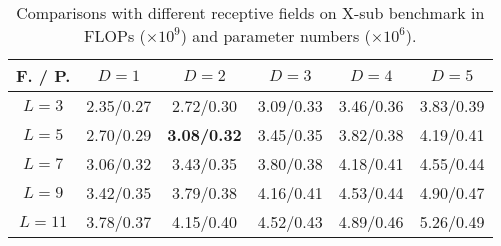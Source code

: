 \documentclass[10pt,journal,compsoc]{IEEEtran}
\begin{document}
\begin{table}[ht]
  \vspace{-0.4cm}
  \caption{Comparisons with different receptive fields on X-sub benchmark in FLOPs ($\times10^9$) and parameter numbers ($\times10^6$).}
  \label{tab:receptive_complexity}
  \vspace{-0.4cm}
  \centering
  \setlength{\tabcolsep}{4pt}
  \renewcommand{\arraystretch}{1.2}
  \begin{tabular}{c|ccccc}
  \toprule
  F. / P.& $D=1$ & $D=2$ & $D=3$ & $D=4$ & $D=5$ \\
  \midrule
  $L=3$ & 2.35/0.27 & 2.72/0.30 & 3.09/0.33 & 3.46/0.36 & 3.83/0.39 \\
  $L=5$ & 2.70/0.29 & {\bf 3.08/0.32} & 3.45/0.35 & 3.82/0.38 & 4.19/0.41 \\
  $L=7$ & 3.06/0.32 & 3.43/0.35 & 3.80/0.38 & 4.18/0.41 & 4.55/0.44 \\
  $L=9$ & 3.42/0.35 & 3.79/0.38 & 4.16/0.41 & 4.53/0.44 & 4.90/0.47 \\
  $L=11$ & 3.78/0.37 & 4.15/0.40 & 4.52/0.43 & 4.89/0.46 & 5.26/0.49 \\
  \bottomrule
  \end{tabular}
\end{table}
\end{document}

